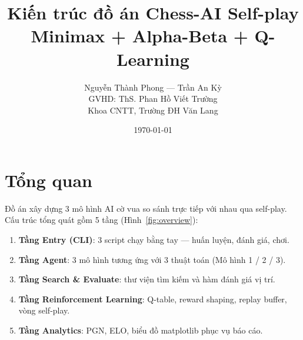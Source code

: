 \documentclass[11pt,a4paper]{article}
\title{\textbf{Kiến trúc đồ án Chess-AI Self-play}\\
\large Minimax + Alpha-Beta + Q-Learning}
\author{Nguyễn Thành Phong --- Trần An Kỳ\\
GVHD: ThS. Phan Hồ Viết Trường\\
Khoa CNTT, Trường ĐH Văn Lang}
\date{\today}
\begin{document}
\maketitle

\section{Tổng quan}

Đồ án xây dựng 3 mô hình AI cờ vua so sánh trực tiếp với nhau qua self-play.
Cấu trúc tổng quát gồm 5 tầng (Hình~\ref{fig:overview}):

\begin{enumerate}
  \item \textbf{Tầng Entry (CLI)}: 3 script chạy bằng tay --- huấn luyện, đánh giá, chơi.
  \item \textbf{Tầng Agent}: 3 mô hình tương ứng với 3 thuật toán (Mô hình 1 / 2 / 3).
  \item \textbf{Tầng Search \& Evaluate}: thư viện tìm kiếm và hàm đánh giá vị trí.
  \item \textbf{Tầng Reinforcement Learning}: Q-table, reward shaping, replay buffer, vòng self-play.
  \item \textbf{Tầng Analytics}: PGN, ELO, biểu đồ matplotlib phục vụ báo cáo.
\end{enumerate}
\end{document}
